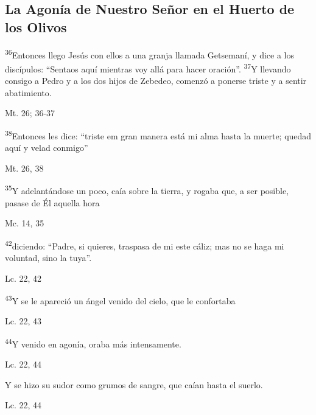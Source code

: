 \documentclass[a4paper,11pt]{article}
\begin{document}
    \subsection*{\hfil La Agonía de Nuestro Señor en el Huerto de los Olivos \hfil}
      
      \textsuperscript{36}Entonces llego Jesús con ellos a una granja llamada Getsemaní, y dice a los discípulos: ``Sentaos aquí mientras voy allá para hacer oración''. 
      \textsuperscript{37}Y llevando consigo a Pedro y a los dos hijos de Zebedeo, comenzó a ponerse triste y a sentir abatimiento.
      \begin{flushright}
        Mt. 26; 36-37     
      \end{flushright}

      \textsuperscript{38}Entonces les dice: ``triste em gran manera está mi alma hasta la muerte; quedad aquí y velad conmigo''
      \begin{flushright}
        Mt. 26, 38
      \end{flushright}

      \textsuperscript{35}Y adelantándose un poco, caía sobre la tierra, y rogaba que, a ser posible, pasase de Él aquella hora
      \begin{flushright}
        Mc. 14, 35  
      \end{flushright}

      \textsuperscript{42}diciendo: ``Padre, si quieres, traspasa de mi este cáliz; mas no se haga mi voluntad, sino la tuya''.
      \begin{flushright}
        Lc. 22, 42
      \end{flushright}

      \textsuperscript{43}Y se le apareció un ángel venido del cielo, que le confortaba
      \begin{flushright}
        Lc. 22, 43
      \end{flushright}

      \textsuperscript{44}Y venido en agonía, oraba más intensamente. 
      \begin{flushright}
        Lc. 22, 44
      \end{flushright}

      Y se hizo su sudor como grumos de sangre, que caían hasta el suerlo.
      \begin{flushright}
        Lc. 22, 44
      \end{flushright}
\end{document}
